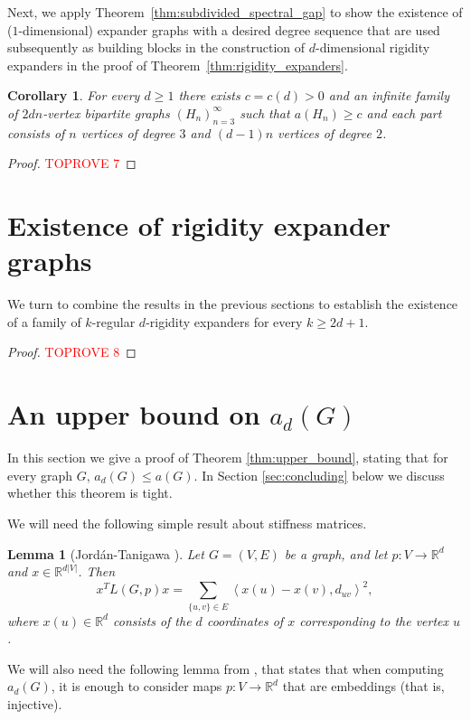 \documentclass[a4paper,11pt]{article}
\theoremstyle{plain}
\newtheorem{corollary}[theorem]{\bf Corollary}
\newtheorem{lemma}[theorem]{\bf Lemma}
\theoremstyle{definition}
\newcommand{\Rea}{{\mathbb R}}
\begin{document}
Next, we apply Theorem~\ref{thm:subdivided_spectral_gap} to show the existence of ($1$-dimensional) expander graphs with a desired degree sequence that are used subsequently as building blocks in the construction of $d$-dimensional rigidity expanders in the proof of Theorem~\ref{thm:rigidity_expanders}.  
\begin{corollary}\label{cor:expanders_with_many_degree_2_vertices}
For every $d\geq 1$ there exists $c=c(d)>0$ and an infinite family of  $2dn$-vertex bipartite graphs $(H_n)_{n=3}^{\infty}$ such that $a(H_n)\geq c$ and each part consists of $n$ vertices of degree $3$ and $(d-1)n$ vertices of degree $2$.    
\end{corollary}

\begin{proof}\textcolor{red}{TOPROVE 7}\end{proof}


\section{Existence of rigidity expander graphs}\label{sec:rigidity_expanders}
We turn to combine the results in the previous sections to establish the existence of a family of $k$-regular $d$-rigidity expanders for every $k\ge 2d+1$.
\begin{proof}\textcolor{red}{TOPROVE 8}\end{proof}


\section{An upper bound on $a_d(G)$}\label{sec:upper_bound}

In this section we give a proof of Theorem \ref{thm:upper_bound}, stating that for every graph $G$, $a_d(G)\leq a(G)$. In Section \ref{sec:concluding} below we discuss whether this theorem is tight.

We will need the following simple result about stiffness matrices.
\begin{lemma}[Jord\'an-Tanigawa {\cite[3.2]{jordan2022rigidity}}]
\label{lemma:quadratic_form}
Let $G=(V,E)$ be a graph, and let $p:V\to \Rea^d$ and $x\in \Rea^{d|V|}$. Then
\[
x^T L(G,p) x = \sum_{\{u,v\}\in E} \left\langle x(u)-x(v), d_{uv}\right\rangle^2,
\]
where $x(u)\in \Rea^d$ consists of the $d$ coordinates of $x$ corresponding to the vertex $u$. 
\end{lemma}

We will also need the following lemma from \cite{lew2022d}, that states that when computing $a_d(G)$, it is enough to consider maps $p:V\to \Rea^d$ that are embeddings (that is, injective).
\end{document}
